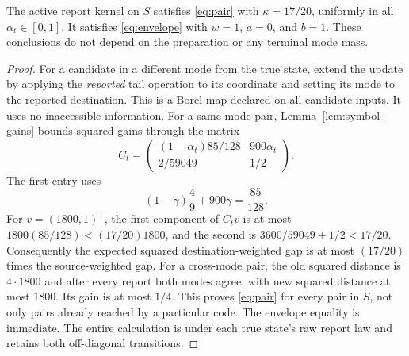 \begin{lemma}\label{lem:symbol-drift}
The active report kernel on $S$ satisfies \eqref{eq:pair} with $\kappa=17/20$, uniformly in all $\alpha_t\in[0,1]$. It satisfies \eqref{eq:envelope} with $w=1$, $a=0$, and $b=1$. These conclusions do not depend on the preparation or any terminal mode mass.
\end{lemma}
\begin{proof}
For a candidate in a different mode from the true state, extend the update by applying the \emph{reported} tail operation to its coordinate and setting its mode to the reported destination. This is a Borel map declared on all candidate inputs. It uses no inaccessible information. For a same-mode pair, Lemma~\ref{lem:symbol-gains} bounds squared gains through the matrix
\begin{equation}\label{eq:symbol-matrix}
 C_t=\begin{pmatrix}
 (1-\alpha_t)85/128 & 900\alpha_t\\
 2/59049 & 1/2
 \end{pmatrix}.
\end{equation}
The first entry uses
\[
 (1-\gamma)\frac49+900\gamma=\frac{85}{128}.
\]
For $v=(1800,1)^{\mathsf T}$, the first component of $C_tv$ is at most $1800(85/128)<(17/20)1800$, and the second is $3600/59049+1/2<17/20$. Consequently the expected squared destination-weighted gap is at most $(17/20)$ times the source-weighted gap. For a cross-mode pair, the old squared distance is $4\cdot1800$ and after every report both modes agree, with new squared distance at most $1800$. Its gain is at most $1/4$. This proves \eqref{eq:pair} for every pair in $S$, not only pairs already reached by a particular code. The envelope equality is immediate. The entire calculation is under each true state's raw report law and retains both off-diagonal transitions.
\end{proof}

